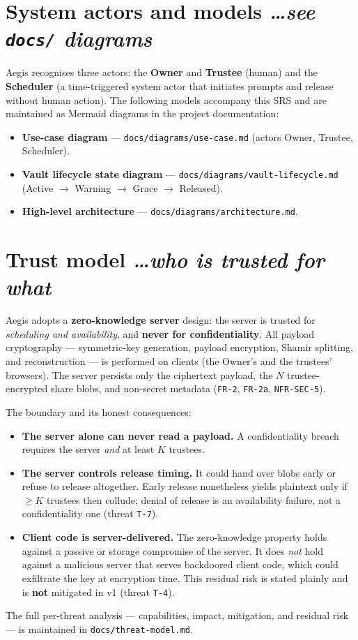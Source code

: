 \documentclass[11pt,a4paper]{article}
\newcommand{\BvrHint}[1]{%
  {\normalfont\normalsize\itshape\hfill #1}}
\newcommand{\ReqID}[1]{\texttt{#1}}
\begin{document}
\section{System actors and models
  \BvrHint{\ldots see \texttt{docs/} diagrams}}
Aegis recognises three actors: the \textbf{Owner} and \textbf{Trustee} (human)
and the \textbf{Scheduler} (a time-triggered system actor that initiates
prompts and release without human action). The following models accompany this
SRS and are maintained as Mermaid diagrams in the project documentation:
\begin{itemize}[leftmargin=0.7cm]
  \item \textbf{Use-case diagram} --- \texttt{docs/diagrams/use-case.md}
    (actors Owner, Trustee, Scheduler).
  \item \textbf{Vault lifecycle state diagram} ---
    \texttt{docs/diagrams/vault-lifecycle.md}
    (Active $\rightarrow$ Warning $\rightarrow$ Grace $\rightarrow$ Released).
  \item \textbf{High-level architecture} ---
    \texttt{docs/diagrams/architecture.md}.
\end{itemize}

\section{Trust model \BvrHint{\ldots who is trusted for what}}
Aegis adopts a \textbf{zero-knowledge server} design: the server is trusted for
\emph{scheduling and availability}, and \textbf{never for confidentiality}. All
payload cryptography --- symmetric-key generation, payload encryption, Shamir
splitting, and reconstruction --- is performed on clients (the Owner's and the
trustees' browsers). The server persists only the ciphertext payload, the $N$
trustee-encrypted share blobs, and non-secret metadata (\ReqID{FR-2},
\ReqID{FR-2a}, \ReqID{NFR-SEC-5}).

The boundary and its honest consequences:
\begin{itemize}[leftmargin=0.7cm]
  \item \textbf{The server alone can never read a payload.} A confidentiality
    breach requires the server \emph{and} at least $K$ trustees.
  \item \textbf{The server controls release timing.} It could hand over blobs
    early or refuse to release altogether. Early release nonetheless yields
    plaintext only if $\ge K$ trustees then collude; denial of release is an
    availability failure, not a confidentiality one (threat \texttt{T-7}).
  \item \textbf{Client code is server-delivered.} The zero-knowledge property
    holds against a passive or storage compromise of the server. It does
    \emph{not} hold against a malicious server that serves backdoored client
    code, which could exfiltrate the key at encryption time. This residual risk
    is stated plainly and is \textbf{not} mitigated in v1 (threat \texttt{T-4}).
\end{itemize}
The full per-threat analysis --- capabilities, impact, mitigation, and residual
risk --- is maintained in \texttt{docs/threat-model.md}.
\end{document}

